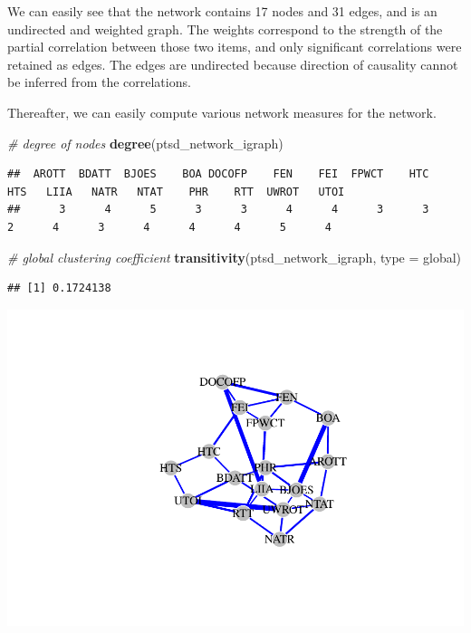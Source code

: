 \documentclass[
]{book}
\newenvironment{Shaded}{\begin{snugshade}}{\end{snugshade}}
\newcommand{\AttributeTok}[1]{\textcolor[rgb]{0.13,0.29,0.53}{#1}}
\newcommand{\CommentTok}[1]{\textcolor[rgb]{0.56,0.35,0.01}{\textit{#1}}}
\newcommand{\FunctionTok}[1]{\textcolor[rgb]{0.13,0.29,0.53}{\textbf{#1}}}
\newcommand{\NormalTok}[1]{#1}
\newcommand{\StringTok}[1]{\textcolor[rgb]{0.31,0.60,0.02}{#1}}
\begin{document}
We can easily see that the network contains 17 nodes and 31 edges, and is an undirected and weighted graph. The weights correspond to the strength of the partial correlation between those two items, and only significant correlations were retained as edges. The edges are undirected because direction of causality cannot be inferred from the correlations.

Thereafter, we can easily compute various network measures for the network.

\begin{Shaded}
\begin{Highlighting}[]
\CommentTok{\# degree of nodes}
\FunctionTok{degree}\NormalTok{(ptsd\_network\_igraph)}
\end{Highlighting}
\end{Shaded}

\begin{verbatim}
##  AROTT  BDATT  BJOES    BOA DOCOFP    FEN    FEI  FPWCT    HTC    HTS   LIIA   NATR   NTAT    PHR    RTT  UWROT   UTOI 
##      3      4      5      3      3      4      4      3      3      2      4      3      4      4      4      5      4
\end{verbatim}

\begin{Shaded}
\begin{Highlighting}[]
\CommentTok{\# global clustering coefficient }
\FunctionTok{transitivity}\NormalTok{(ptsd\_network\_igraph, }\AttributeTok{type =} \StringTok{\textquotesingle{}global\textquotesingle{}}\NormalTok{)}
\end{Highlighting}
\end{Shaded}

\begin{verbatim}
## [1] 0.1724138
\end{verbatim}

\includegraphics{bookdown-demo_files/figure-latex/test-1.pdf}
\end{document}
